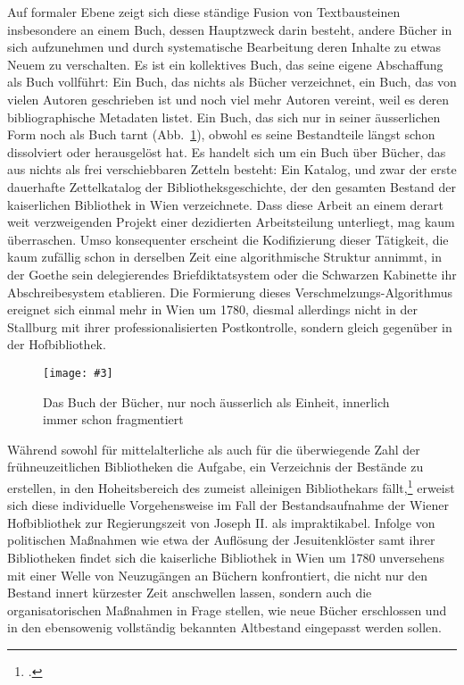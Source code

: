 \documentclass[a4paper,10pt]{article}
\newcommand{\pngbild}[4]{\texttt{[image: \#3]}}
\begin{document}
Auf formaler Ebene zeigt sich diese ständige Fusion von Textbausteinen insbesondere an einem Buch, dessen Hauptzweck darin besteht, andere Bücher in sich aufzunehmen und durch systematische Bearbeitung deren Inhalte zu etwas Neuem zu verschalten. Es ist ein kollektives Buch, das seine eigene Abschaffung als Buch vollführt: Ein Buch, das nichts als Bücher verzeichnet, ein Buch, das von vielen Autoren geschrieben ist und noch viel mehr Autoren vereint, weil es deren bibliographische Metadaten listet. Ein Buch, das sich nur in seiner äusserlichen Form noch als Buch tarnt (Abb.~\ref{abb:kapsel}), obwohl es seine Bestandteile längst schon dissolviert oder herausgelöst hat. Es handelt sich um ein Buch über Bücher, das aus nichts als frei verschiebbaren Zetteln besteht: Ein Katalog, und zwar der erste dauerhafte Zettelkatalog der Bibliotheksgeschichte, der den gesamten Bestand der kaiserlichen Bibliothek in Wien verzeichnete. Dass diese Arbeit an einem derart weit verzweigenden Projekt einer dezidierten Arbeitsteilung unterliegt, mag kaum überraschen. Umso konsequenter erscheint die Kodifizierung dieser Tätigkeit, die kaum zufällig schon in derselben Zeit eine algorithmische Struktur annimmt, in der Goethe sein delegierendes Briefdiktatsystem oder die Schwarzen Kabinette ihr Abschreibesystem etablieren. Die Formierung dieses Verschmelzungs-Algorithmus ereignet sich einmal mehr in Wien um 1780, diesmal allerdings nicht in der Stallburg mit ihrer professionalisierten Postkontrolle, sondern gleich gegenüber in der Hofbibliothek.

\begin{figure}[ht]
\begin{center}
\pngbild{1335}{982}{../bilder/Kapsel.png}{\textwidth}\\[-3mm]
\caption{Das Buch der Bücher, nur noch äusserlich als Einheit, innerlich immer schon fragmentiert}\label{abb:kapsel}
\end{center}
\end{figure}

Während sowohl für mittelalterliche als auch für die überwiegende Zahl der frühneuzeitlichen Bibliotheken die Aufgabe, ein Verzeichnis der Bestände zu erstellen, in den Hoheitsbereich des zumeist alleinigen Bibliothekars fällt,\footcite[Vgl. für die mittelalterliche Katalogpraxis etwa][]{schreiber:1927} erweist sich diese individuelle Vorgehensweise im Fall der Bestandsaufnahme der Wiener Hofbibliothek zur Regierungszeit von Joseph II. als impraktikabel. Infolge von politischen Maßnahmen wie etwa der Auflösung der Jesuitenklöster samt ihrer Bibliotheken findet sich die kaiserliche Bibliothek in Wien um 1780 unversehens mit einer Welle von Neuzugängen an Büchern konfrontiert, die nicht nur den Bestand innert kürzester Zeit anschwellen lassen, sondern auch die organisatorischen Maßnahmen in Frage stellen, wie neue Bücher erschlossen und in den ebensowenig vollständig bekannten Altbestand eingepasst werden sollen.   
  
\end{document}
